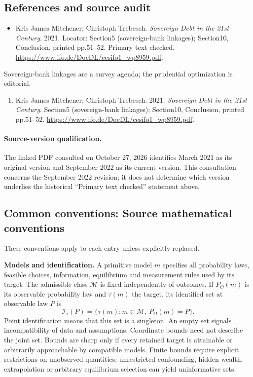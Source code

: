 \documentclass[11pt,a4paper]{article}
\begin{document}
\subsection*{References and source audit}
\begin{itemize}
\item Kris James Mitchener; Christoph Trebesch. \emph{Sovereign Debt in the 21st Century}. 2021. Locator: Section5 (sovereign-bank linkages); Section10, Conclusion, printed pp.51--52. Primary text checked. \url{https://www.ifo.de/DocDL/cesifo1_wp8959.pdf}.
\end{itemize}
Sovereign-bank linkages are a survey agenda; the prudential optimization is editorial.
\begin{enumerate}\raggedright
\item\hypertarget{definitions:source:30007536:1}{} Kris James Mitchener; Christoph Trebesch. 2021. \emph{Sovereign Debt in the 21st Century}. Section5 (sovereign-bank linkages); Section10, Conclusion, printed pp.51--52.
\url{https://www.ifo.de/DocDL/cesifo1_wp8959.pdf}.
\end{enumerate}

\paragraph{Source-version qualification.} The linked PDF consulted on October 27, 2026 identifies March 2021 as its original version and September 2022 as its current version. This consultation concerns the September 2022 revision; it does not determine which version underlies the historical ``Primary text checked'' statement above.

\subsection*{Common conventions: Source mathematical conventions}

These conventions apply to each entry unless explicitly replaced.

\textbf{Models and identification.} A primitive model \(m\) specifies all probability laws, feasible choices, information, equilibrium and measurement rules used by its target. The admissible class \(\mathcal M\) is fixed independently of outcomes. If \(P_O(m)\) is its observable probability law and \(\tau(m)\) the target, its identified set at observable law \(P\) is
\[
 \mathcal I_\tau(P)=\{\tau(m):m\in\mathcal M,\ P_O(m)=P\}.
\]
Point identification means that this set is a singleton. An empty set signals incompatibility of data and assumptions. Coordinate bounds need not describe the joint set. Bounds are sharp only if every retained target is attainable or arbitrarily approachable by compatible models. Finite bounds require explicit restrictions on unobserved quantities; unrestricted confounding, hidden wealth, extrapolation or arbitrary equilibrium selection can yield uninformative sets.
\end{document}
